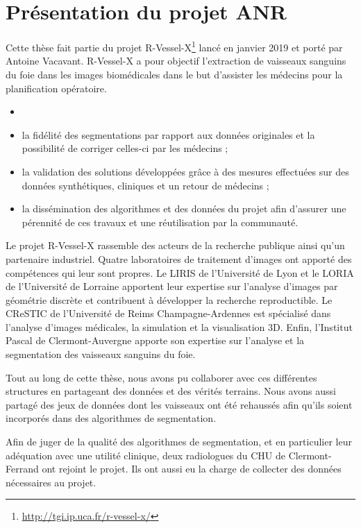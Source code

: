 \section{Présentation du projet ANR}
\label{sec:introduction:objectifs}
Cette thèse fait partie du projet R-Vessel-X\footnote{\url{http://tgi.ip.uca.fr/r-vessel-x/}} lancé en janvier 2019 et porté par Antoine Vacavant. R-Vessel-X a pour objectif l'extraction de vaisseaux sanguins du foie dans les images biomédicales dans le but d'assister les médecins pour la planification opératoire. 
\begin{itemize}
\item {}
\item la fidélité des segmentations par rapport aux données originales et la possibilité de corriger celles-ci par les médecins ;
\item la validation des solutions développées grâce à des mesures effectuées sur des données synthétiques, cliniques et un retour de médecins ;
\item la dissémination des algorithmes et des données du projet afin d'assurer une pérennité de ces travaux et une réutilisation par la communauté.
\end{itemize}
Le projet R-Vessel-X rassemble des acteurs de la recherche publique ainsi qu'un partenaire industriel. Quatre laboratoires de traitement d'images ont apporté des compétences qui leur sont propres. Le LIRIS de l'Université de Lyon et le LORIA de l'Université de Lorraine apportent leur expertise sur l'analyse d'images par géométrie discrète et contribuent à développer la recherche reproductible. Le CReSTIC de l'Université de Reims Champagne-Ardennes est spécialisé dans l'analyse d'images médicales, la simulation et la visualisation 3D. Enfin, l'Institut Pascal de Clermont-Auvergne apporte son expertise sur l'analyse et la segmentation des vaisseaux sanguins du foie. 

Tout au long de cette thèse, nous avons pu collaborer avec ces différentes structures en partageant des données et des vérités terrains. Nous avons aussi partagé des jeux de données dont les vaisseaux ont été rehaussés afin qu'ils soient incorporés dans des algorithmes de segmentation.

Afin de juger de la qualité des algorithmes de segmentation, et en particulier leur adéquation avec une utilité clinique, deux radiologues du CHU de Clermont-Ferrand ont rejoint le projet. Ils ont aussi eu la charge de collecter des données nécessaires au projet.

